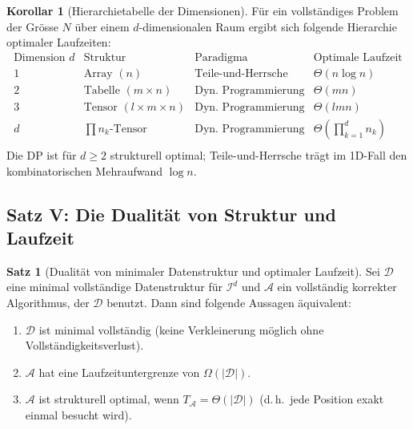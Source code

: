 ﻿\documentclass[a4paper,12pt]{article}
\theoremstyle{definition}
\newtheorem{satz}{Satz}
\newtheorem{korollar}{Korollar}
\begin{document}
\begin{korollar}[Hierarchietabelle der Dimensionen]
    \label{kor:hierarchie}
    F\"{u}r ein vollst\"{a}ndiges Problem der Gr\"{o}sse $N$ \"{u}ber einem
    $d$-dimensionalen Raum ergibt sich folgende Hierarchie optimaler Laufzeiten:
    \[
    \begin{array}{c|c|c|c}
        \text{Dimension } d & \text{Struktur} & \text{Paradigma}
        & \text{Optimale Laufzeit} \\
        \hline
        1 & \text{Array } (n) & \text{Teile-und-Herrsche} & \Theta(n \log n) \\
        2 & \text{Tabelle } (m \times n) & \text{Dyn.\ Programmierung} & \Theta(mn) \\
        3 & \text{Tensor } (l \times m \times n) & \text{Dyn.\ Programmierung} & \Theta(lmn) \\
        d & \prod n_k\text{-Tensor} & \text{Dyn.\ Programmierung}
          & \Theta\!\left(\prod_{k=1}^d n_k\right) \\
    \end{array}
    \]
    Die DP ist f\"{u}r $d \geq 2$ strukturell optimal; Teile-und-Herrsche
    tr\"{a}gt im 1D-Fall den kombinatorischen Mehraufwand $\log n$.
\end{korollar}

\subsection{Satz V: Die Dualit\"{a}t von Struktur und Laufzeit}

\begin{satz}[Dualit\"{a}t von minimaler Datenstruktur und optimaler Laufzeit]
    \label{satz:dualitaet}
    Sei $\mathcal{D}$ eine minimal vollst\"{a}ndige Datenstruktur f\"{u}r
    $\mathcal{I}^d$ und $\mathcal{A}$ ein vollst\"{a}ndig korrekter Algorithmus,
    der $\mathcal{D}$ benutzt. Dann sind folgende Aussagen \"{a}quivalent:
    \begin{enumerate}
        \item $\mathcal{D}$ ist minimal vollst\"{a}ndig (keine Verkleinerung
              m\"{o}glich ohne Vollst\"{a}ndigkeitsverlust).
        \item $\mathcal{A}$ hat eine Laufzeituntergrenze von $\Omega(|\mathcal{D}|)$.
        \item $\mathcal{A}$ ist strukturell optimal, wenn
              $T_{\mathcal{A}} = \Theta(|\mathcal{D}|)$
              (d.\,h.\ jede Position exakt einmal besucht wird).
    \end{enumerate}
\end{satz}
\end{document}
